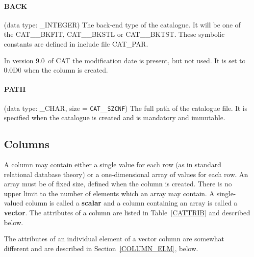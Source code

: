 \documentclass[11pt,twoside]{starlink}
\providecommand{\CATversion}{9.0~}
\begin{document}
\paragraph{BACK}
(data type: \_INTEGER)
The back-end type of the catalogue. It will be one of the CAT\_\_BKFIT,
CAT\_\_BKSTL or CAT\_\_BKTST. These symbolic constants are defined in
include file CAT\_PAR.

In version \CATversion of CAT the modification date is present, but
not used. It is set to 0.0D0 when the column is created.

\paragraph{PATH}
(data type: \_CHAR, size = \texttt{CAT\_\_SZCNF}) The full path of the
catalogue file. It is specified when the catalogue is created and is
mandatory and immutable.

\subsection{\label{COLS}Columns}

A column may contain either a single value for each row (as in
standard relational database theory) or a one-dimensional array of
values for each row. An array must be of fixed size, defined when the
column is created. There is no upper limit to the number of elements
which an array may contain. A single-valued column is called a \textbf{scalar} and a column containing an array is called  a \textbf{vector}.
The attributes of a column are listed in Table~\ref{CATTRIB} and
described below.

The attributes of an individual element of a vector column are somewhat
different and are described in Section~\ref{COLUMN_ELM}, below.
\end{document}
